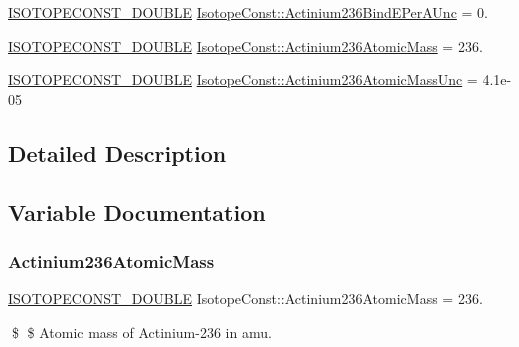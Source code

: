 \begin{DoxyCompactItemize}
\mbox{\hyperlink{group___isotope_const-_macros_ga8f45a7272ce02c0b4c65c44636ed719a}{I\+S\+O\+T\+O\+P\+E\+C\+O\+N\+S\+T\+\_\+\+D\+O\+U\+B\+LE}} \mbox{\hyperlink{group___isotope_const-_actinium-_ac236_gacff25c046593aab9cd9bd2051ae1bfc2}{Isotope\+Const\+::\+Actinium236\+Bind\+E\+Per\+A\+Unc}} = 0.
\item 
\mbox{\hyperlink{group___isotope_const-_macros_ga8f45a7272ce02c0b4c65c44636ed719a}{I\+S\+O\+T\+O\+P\+E\+C\+O\+N\+S\+T\+\_\+\+D\+O\+U\+B\+LE}} \mbox{\hyperlink{group___isotope_const-_actinium-_ac236_gab76fd0d8d3b0a2bbcb0f70101c82cb71}{Isotope\+Const\+::\+Actinium236\+Atomic\+Mass}} = 236.
\item 
\mbox{\hyperlink{group___isotope_const-_macros_ga8f45a7272ce02c0b4c65c44636ed719a}{I\+S\+O\+T\+O\+P\+E\+C\+O\+N\+S\+T\+\_\+\+D\+O\+U\+B\+LE}} \mbox{\hyperlink{group___isotope_const-_actinium-_ac236_ga7baf604cddc0843a6b24df02ef59d4a4}{Isotope\+Const\+::\+Actinium236\+Atomic\+Mass\+Unc}} = 4.\+1e-\/05
\end{DoxyCompactItemize}


\subsection{Detailed Description}


\subsection{Variable Documentation}
\mbox{\label{group___isotope_const-_actinium-_ac236_gab76fd0d8d3b0a2bbcb0f70101c82cb71}} 
\subsubsection{\texorpdfstring{Actinium236\+Atomic\+Mass}{Actinium236AtomicMass}}
{\footnotesize\ttfamily \mbox{\hyperlink{group___isotope_const-_macros_ga8f45a7272ce02c0b4c65c44636ed719a}{I\+S\+O\+T\+O\+P\+E\+C\+O\+N\+S\+T\+\_\+\+D\+O\+U\+B\+LE}} Isotope\+Const\+::\+Actinium236\+Atomic\+Mass = 236.}

\$ \$ Atomic mass of Actinium-\/236 in amu. \mbox{\label{group___isotope_const-_actinium-_ac236_ga7baf604cddc0843a6b24df02ef59d4a4}} 
